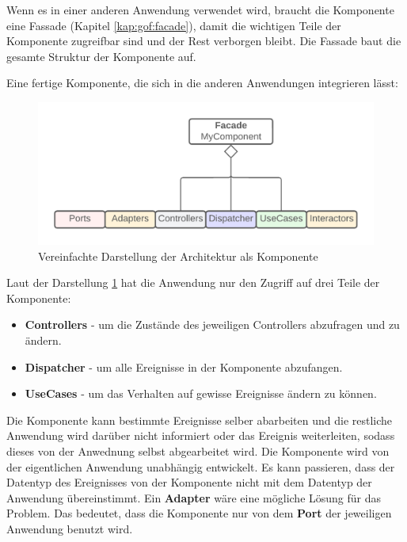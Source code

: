 \newpage
Wenn es in einer anderen Anwendung verwendet wird, braucht die Komponente eine Fassade (Kapitel \ref{kap:gof:facade}), damit 
die wichtigen Teile der Komponente zugreifbar sind und der Rest verborgen bleibt. 
Die Fassade baut die gesamte Struktur der Komponente auf.

Eine fertige Komponente, die sich in die anderen Anwendungen integrieren lässt:

\begin{figure}[H]
    \centering
    \includegraphics[width=1\textwidth]{./images/Architecture as Facade.png}
    \caption{Vereinfachte Darstellung der Architektur als Komponente}
    \label{fig:SimpliedArchitectureAsKomponent}
\end{figure}

Laut der Darstellung \ref{fig:SimpliedArchitectureAsKomponent} hat die Anwendung nur den Zugriff auf drei Teile der Komponente:
\begin{itemize}
    \item \textbf{Controllers} - um die Zustände des jeweiligen Controllers abzufragen und zu ändern.
    \item \textbf{Dispatcher} - um alle Ereignisse in der Komponente abzufangen.
    \item \textbf{UseCases} - um das Verhalten auf gewisse Ereignisse ändern zu können.
\end{itemize}

Die Komponente kann bestimmte Ereignisse selber abarbeiten und die restliche Anwendung wird darüber nicht informiert oder
das Ereignis weiterleiten, sodass dieses von der Anwednung selbst abgearbeitet wird.
Die Komponente wird von der eigentlichen Anwendung unabhängig entwickelt. 
Es kann passieren, dass
der Datentyp des Ereignisses von der Komponente nicht mit dem Datentyp der Anwendung übereinstimmt. 
Ein \textbf{Adapter} wäre eine mögliche Lösung für das Problem.
Das bedeutet, dass die Komponente nur von dem \textbf{Port} der jeweiligen Anwendung benutzt wird.

